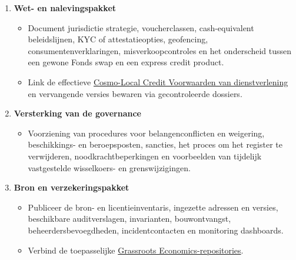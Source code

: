 \documentclass[11pt]{article}
\begin{document}
\begin{enumerate}[leftmargin=*]
\begin{itemize}[leftmargin=*]
\end{itemize}
\item \textbf{Wet- en nalevingspakket}
\begin{itemize}[leftmargin=*]
\item Document jurisdictie strategie, voucherclassen, cash-equivalent beleidslijnen, KYC of attestatieopties, geofencing, consumentenverklaringen, misverkoopcontroles en het onderscheid tussen een gewone Fonds swap en een express credit product.
\item Link de effectieve \href{https://docs.cosmolocal.credit/nl-BE/governance/terms}{Cosmo-Local Credit Voorwaarden van dienstverlening} en vervangende versies bewaren via gecontroleerde dossiers.
\end{itemize}
\item \textbf{Versterking van de governance}
\begin{itemize}[leftmargin=*]
\item Voorziening van procedures voor belangenconflicten en weigering, beschikkings- en beroepsposten, sancties, het proces om het register te verwijderen, noodkrachtbeperkingen en voorbeelden van tijdelijk vastgestelde wisselkoers- en grenswijzigingen.
\end{itemize}
\item \textbf{Bron en verzekeringspakket}
\begin{itemize}[leftmargin=*]
\item Publiceer de bron- en licentieinventaris, ingezette adressen en versies, beschikbare auditverslagen, invarianten, bouwontvangst, beheerdersbevoegdheden, incidentcontacten en monitoring dashboards.
\item Verbind de toepasselijke \href{https://github.com/grassrootseconomics}{Grassroots Economics-repositories}.
\end{itemize}
\end{enumerate}
\end{document}

